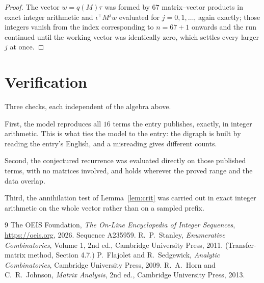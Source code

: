 \documentclass[11pt,a4paper]{article}
\theoremstyle{plain}
\theoremstyle{definition}
\begin{document}
\begin{proof}
The vector $w=q(M)\tau$ was formed by $67$ matrix--vector products in exact integer
arithmetic and $\iota^{\!\top}M^{j}w$ evaluated for $j=0,1,\dots$, again exactly; those
integers vanish from the index corresponding to $n=67+1$ onwards and the run continued
until the working vector was identically zero, which settles every larger $j$ at once.
\end{proof}

\section{Verification}

Three checks, each independent of the algebra above.

First, the model reproduces all $16$ terms the entry publishes, exactly, in integer
arithmetic. This is what ties the model to the entry: the digraph is built by reading the
entry's English, and a misreading gives different counts.

Second, the conjectured recurrence was evaluated directly on those published terms, with no
matrices involved, and holds wherever the proved range and the data overlap.

Third, the annihilation test of Lemma~\ref{lem:crit} was carried out in exact integer
arithmetic on the whole vector rather than on a sampled prefix.

\begin{thebibliography}{9}
 The OEIS Foundation, \emph{The On-Line Encyclopedia of Integer
Sequences}, \url{https://oeis.org}, 2026. Sequence A235959.
 R.~P.~Stanley, \emph{Enumerative Combinatorics}, Volume 1, 2nd ed.,
Cambridge University Press, 2011. (Transfer-matrix method, Section 4.7.)
 P.~Flajolet and R.~Sedgewick, \emph{Analytic Combinatorics}, Cambridge
University Press, 2009.
 R.~A.~Horn and C.~R.~Johnson, \emph{Matrix Analysis}, 2nd ed., Cambridge
University Press, 2013.
\end{thebibliography}
\end{document}
